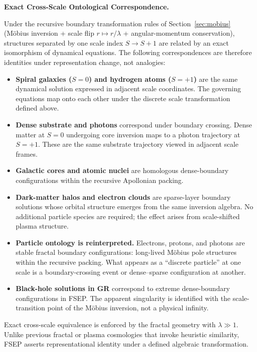 \documentclass[11pt,letterpaper]{article}
\begin{document}
\begin{mdframed}
\textbf{Exact Cross-Scale Ontological Correspondence.}

Under the recursive boundary transformation rules of Section~\ref{sec:mobius}
(M\"obius inversion + scale flip $r \mapsto r/\lambda$ + angular-momentum
conservation), structures separated by one scale index $S \rightarrow S+1$ are
related by an exact isomorphism of dynamical equations. The following
correspondences are therefore identities under representation change, not analogies:

\begin{itemize}
\item \textbf{Spiral galaxies ($S{=}0$) and hydrogen atoms ($S{=}+1$)} are the
same dynamical solution expressed in adjacent scale coordinates. The governing
equations map onto each other under the discrete scale transformation defined above.

\item \textbf{Dense substrate and photons} correspond under boundary crossing.
Dense matter at $S{=}0$ undergoing core inversion maps to a photon trajectory at
$S{=}+1$. These are the same substrate trajectory viewed in adjacent scale frames.

\item \textbf{Galactic cores and atomic nuclei} are homologous dense-boundary
configurations within the recursive Apollonian packing.

\item \textbf{Dark-matter halos and electron clouds} are sparse-layer boundary
solutions whose orbital structure emerges from the same inversion algebra. No
additional particle species are required; the effect arises from scale-shifted
plasma structure.

\item \textbf{Particle ontology is reinterpreted.} Electrons, protons, and photons
are stable fractal boundary configurations: long-lived M\"obius pole structures
within the recursive packing. What appears as a ``discrete particle'' at one scale
is a boundary-crossing event or dense--sparse configuration at another.

\item \textbf{Black-hole solutions in GR} correspond to extreme dense-boundary
configurations in FSEP. The apparent singularity is identified with the
scale-transition point of the M\"obius inversion, not a physical infinity.
\end{itemize}

Exact cross-scale equivalence is enforced by the fractal geometry with
$\lambda \gg 1$. Unlike previous fractal or plasma cosmologies that invoke heuristic
similarity, FSEP asserts representational identity under a defined algebraic
transformation.
\end{mdframed}
\end{document}
